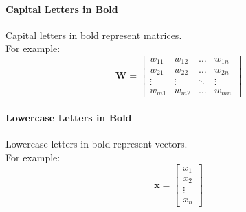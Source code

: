 \paragraph{Capital Letters in Bold} 
Capital letters in bold represent matrices. \\
For example:
\begin{equation}
    \mathbf{W} = \begin{bmatrix} w_{11} & w_{12} & \dots & w_{1n} \\ w_{21} & w_{22} & \dots & w_{2n} \\ \vdots & \vdots & \ddots & \vdots \\ w_{m1} & w_{m2} & \dots & w_{mn} \end{bmatrix}
\end{equation}

\paragraph{Lowercase Letters in Bold} 
Lowercase letters in bold represent vectors. \\
For example:
\begin{equation}
    \mathbf{x} = \begin{bmatrix} x_1 \\ x_2 \\ \vdots \\ x_n \end{bmatrix}
\end{equation}
